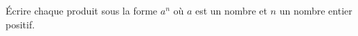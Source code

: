 \documentclass[exercice]{thedocument}%
\begin{document}
%
Écrire chaque produit sous la forme $a^n$ où $a$ est un nombre
et $n$ un nombre entier positif.
\simpleCalcList
\end{document}
